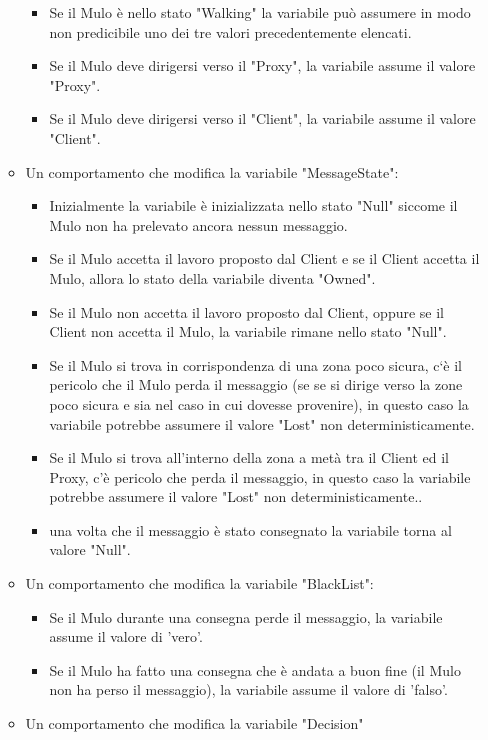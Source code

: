 \documentclass[13pt,a4paper]{article}
\begin{document}
\begin{itemize}
\begin{itemize}
		\begin{itemize}
			\item Se il Mulo è nello stato "Walking" la variabile può assumere in modo non predicibile uno dei tre valori precedentemente elencati. 
			\item Se il Mulo deve dirigersi verso il "Proxy", la variabile assume il valore "Proxy".
			\item Se il Mulo deve dirigersi verso il "Client", la variabile assume il valore "Client".
		\end{itemize}
	\item Un comportamento che modifica la variabile "MessageState":
	\begin{itemize}
		\item Inizialmente la variabile è inizializzata nello stato "Null" siccome il Mulo non ha prelevato ancora nessun messaggio.
		\item Se il Mulo accetta il lavoro proposto dal Client e se il Client  accetta il Mulo, allora lo stato della variabile diventa "Owned".
		\item Se il Mulo non accetta il lavoro proposto dal Client, oppure se il Client non accetta il Mulo,  la variabile rimane nello stato "Null".
		\item Se il Mulo si trova in corrispondenza di una zona poco sicura, c`è il pericolo che il Mulo perda il messaggio (se se si dirige verso la zone poco sicura e sia nel caso in cui dovesse provenire), in questo caso la variabile potrebbe assumere il valore "Lost" non deterministicamente.
		\item Se il Mulo si trova all'interno della zona a metà tra il Client ed il Proxy, c'è pericolo che perda il messaggio, in questo caso la variabile potrebbe assumere il valore "Lost" non deterministicamente..
		\item una volta che il messaggio è stato consegnato la variabile torna al valore "Null".
	\end{itemize}
	\item Un comportamento che modifica la variabile "BlackList":
	\begin{itemize}
		\item Se il Mulo durante una consegna perde il messaggio, la variabile assume il valore di 'vero'.
		\item Se il Mulo ha fatto una consegna che è andata a buon fine (il Mulo non ha perso il messaggio), la variabile assume il valore di 'falso'.
	\end{itemize} 
	\item Un comportamento che modifica la variabile "Decision"

\end{itemize}
\end{itemize}
\end{document}
